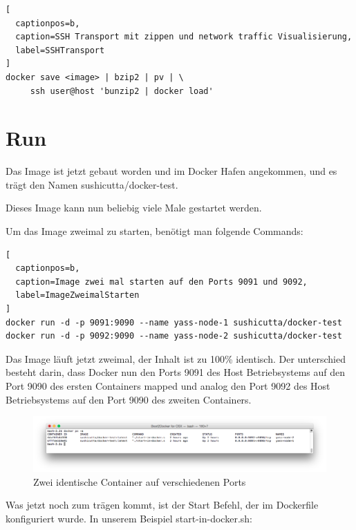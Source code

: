 \begin{lstlisting}[
  captionpos=b,
  caption=SSH Transport mit zippen und network traffic Visualisierung,
  label=SSHTransport
]
docker save <image> | bzip2 | pv | \
     ssh user@host 'bunzip2 | docker load'
\end{lstlisting}

\section{Run}

Das Image ist jetzt gebaut worden und im Docker Hafen angekommen, und es trägt den Namen
sushicutta/docker-test.

Dieses Image kann nun beliebig viele Male gestartet werden.

Um das Image zweimal zu starten, benötigt man folgende Commands:
\\

\begin{lstlisting}[
  captionpos=b,
  caption=Image zwei mal starten auf den Ports 9091 und 9092,
  label=ImageZweimalStarten
]
docker run -d -p 9091:9090 --name yass-node-1 sushicutta/docker-test
docker run -d -p 9092:9090 --name yass-node-2 sushicutta/docker-test
\end{lstlisting}

Das Image läuft jetzt zweimal, der Inhalt ist zu 100\% identisch. Der unterschied
besteht darin, dass Docker nun den Ports 9091 des Host Betriebsystems auf den Port 9090 des
ersten Containers mapped und analog den Port 9092 des Host Betriebsystems auf den Port 9090
des zweiten Containers.

\begin{figure}[htbp]
  \begin{center}
    \includegraphics[width=1.0\textwidth]{./images/twoProcesses.png}
    \caption{Zwei identische Container auf verschiedenen Ports}
    \label{img:twoProcesses}
  \end{center}
\end{figure}

Was jetzt noch zum trägen kommt, ist der Start Befehl, der im Dockerfile
konfiguriert wurde. In unserem Beispiel start-in-docker.sh:
\\

